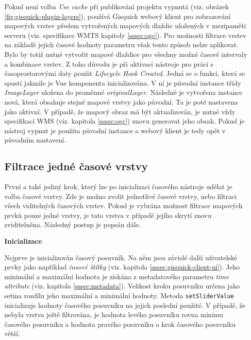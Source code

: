 Pokud není volba \textit{Use cache} při publikování projektu vypnutá
(viz. obrázek \ref{fig:gisquick-plugin-layers}), používá Gisquick
webový klient pro zobrazování mapových vrstev předem vytvořených
mapových dlaždic uložených v mezipaměti serveru (viz. specifikace WMTS
kapitoly \ref{sssec:ogc}). Pro možnosti filtrace vrstev na základě
jejich časové hodnoty parametru však tento způsob nelze
aplikovat. Bylo by totiž nutné vytvořit mapové dlaždice pro všechny
možné časové intervaly a kombinace vrstev. Z toho důvodu je při
aktivaci nástroje pro práci s časoprostorovými daty
použit \textit{Lifecycle Hook Created}. Jedná se o funkci, která se
spustí jakmile je Vue komponenta inicializována. V ní je původní
instance třídy \textit{ImageLayer} uložena do
proměnné \textit{originalLayer}. Následně je vytvořena
instance nová, která obsahuje stejné mapové vrstvy jako původní. Ta je
poté nastavena jako aktivní. V případě, že mapový obraz má být
aktualizován, je nutné vždy specifikací WMS
(viz. kapitola \ref{sssec:ogc}) znovu generovat jeho obsah. Pokud je
nástroj vypnut je použita původní instance a webový klient je tedy
opět v původním nastavení.

\subsection{Filtrace jedné časové vrstvy}
\label{sssec:one-layer-filtration}

První a také jediný krok, který lze po inicializaci časového nástroje
udělat je volba časové vrstvy. Zde je možno zvolit jednotlivé časové
vrstvy, nebo filtraci všech viditelných časových vrstev. Pokud je
vybrána možnost filtrace mapových prvků pouze jedné vrstvy, je tato
vrstva v případě jejího skrytí znovu zviditelněna. Následný postup
je popsán dále.

\bigskip
\noindent \textbf{Inicializace}

Nejprve je inicializován časový posuvník. Na něm jsou závislé
další uživatelské prvky jako například \textit{časové štítky}
(viz. kapitola \ref{sssec:gisquick-client-ui}). Jeho minimální a maximální
hodnota je získána z metadatového parametru \textit{time\textunderscore
attribute} (viz. kapitola \ref{sssec:metadata}). Velikost kroku posuvníku
určena jako setina rozdílu jeho maximální a minimální hodnoty. Metoda
\verb|setSliderValue| inicializuje hodnoty časového posuvníku na jejich poslední
použité. V případě, že nebyla vrstva ještě filtrována, je hodnota
levého posuvníku rovna minimu časového posuvníku a hodnota pravého
posuvníku o krok časového posuvníku větší.

